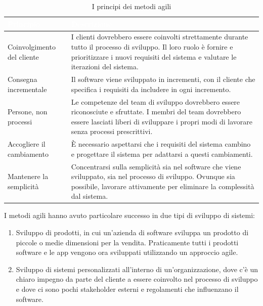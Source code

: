 \begin{table}[ht]
\centering
{}
\begin{tabular}{|p{5cm}|p{10cm}|}
\hline
\rowcolor{headerblue}
\textbf{\textcolor{white}{Principio}} & \textbf{\textcolor{white}{Descrizione}} \\
\hline
Coinvolgimento del cliente & I clienti dovrebbero essere coinvolti strettamente durante tutto il processo di sviluppo. Il loro ruolo è fornire e prioritizzare i nuovi requisiti del sistema e valutare le iterazioni del sistema. \\
\hline
Consegna incrementale & Il software viene sviluppato in incrementi, con il cliente che specifica i requisiti da includere in ogni incremento. \\
\hline
Persone, non processi & Le competenze del team di sviluppo dovrebbero essere riconosciute e sfruttate. I membri del team dovrebbero essere lasciati liberi di sviluppare i propri modi di lavorare senza processi prescrittivi. \\
\hline
Accogliere il cambiamento & È necessario aspettarsi che i requisiti del sistema cambino e progettare il sistema per adattarsi a questi cambiamenti. \\
\hline
Mantenere la semplicità & Concentrarsi sulla semplicità sia nel software che viene sviluppato, sia nel processo di sviluppo. Ovunque sia possibile, lavorare attivamente per eliminare la complessità dal sistema. \\
\hline
\end{tabular}
\caption{I principi dei metodi agili}
\label{tab:principi-metodi-agili}
\end{table}

I metodi agili hanno avuto particolare successo in due tipi di sviluppo di sistemi:
\begin{enumerate}
    \item Sviluppo di prodotti, in cui un'azienda di software sviluppa un prodotto di piccole o medie dimensioni per la vendita. Praticamente tutti i prodotti software e le app vengono ora sviluppati utilizzando un approccio agile.
    \item Sviluppo di sistemi personalizzati all'interno di un'organizzazione, dove c'è un chiaro impegno da parte del cliente a essere coinvolto nel processo di sviluppo e dove ci sono pochi stakeholder esterni e regolamenti che influenzano il software.
\end{enumerate}

